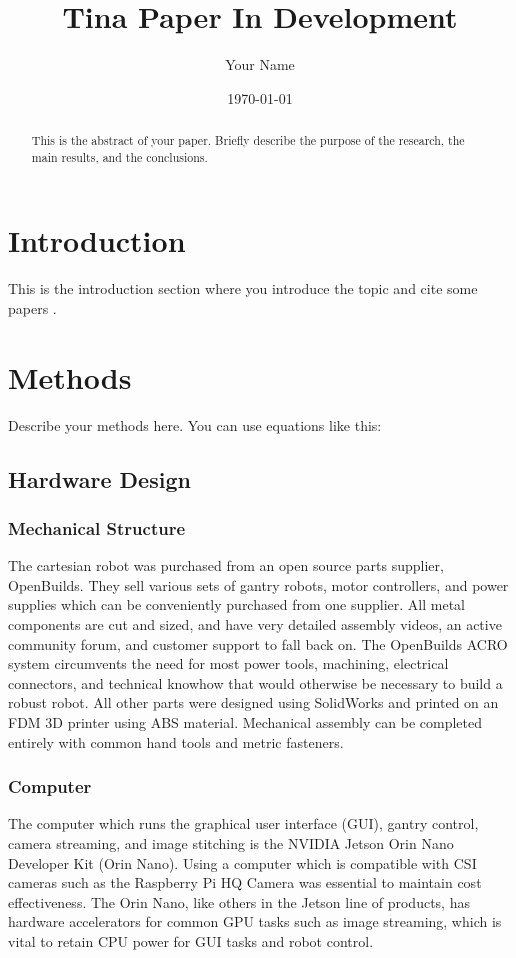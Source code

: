 \documentclass[a4paper,12pt]{article}
\title{Tina Paper In Development}
\author{Your Name}
\date{\today}
\begin{document}
\maketitle

\begin{abstract}
    This is the abstract of your paper. Briefly describe the purpose of the research, the main results, and the conclusions.
\end{abstract}

\section{Introduction}
This is the introduction section where you introduce the topic and cite some papers \citep{mohammadi_comparative_2024}.

\section{Methods}
Describe your methods here. You can use equations like this:

\subsection{Hardware Design}

\subsubsection{Mechanical Structure}
The cartesian robot was purchased from an open source parts supplier, OpenBuilds. They sell various sets of gantry robots, motor controllers, and power supplies
which can be conveniently purchased from one supplier. All metal components are cut and sized, and have very detailed assembly videos, an active community forum,
and customer support to fall back on. The OpenBuilds ACRO system circumvents the need for most power tools, machining, electrical connectors, and technical knowhow that would otherwise be necessary to build a robust robot.
All other parts were designed using SolidWorks and printed on an FDM 3D printer using ABS material. Mechanical assembly can be completed entirely with common hand tools and metric fasteners. 

\subsubsection{Computer}
The computer which runs the graphical user interface (GUI), gantry control, camera streaming, and image stitching is the NVIDIA Jetson Orin Nano Developer Kit (Orin Nano). Using a computer
which is compatible with CSI cameras such as the Raspberry Pi HQ Camera was essential to maintain cost effectiveness. The Orin Nano, like others in the Jetson line of products, has hardware
accelerators for common GPU tasks such as image streaming, which is vital to retain CPU power for GUI tasks and robot control. 
\end{document}

